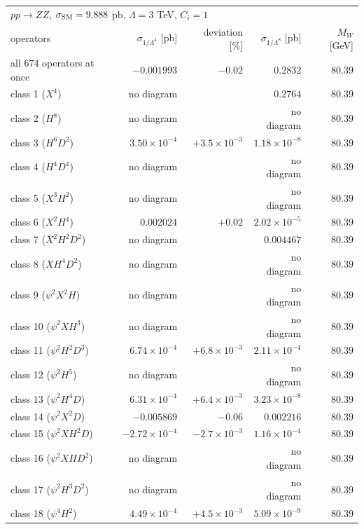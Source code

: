\begin{table}[t]\centering\footnotesize\setlength{\tabcolsep}{4pt}
\begin{tabular}{@{}lrrrr@{}}\hline
\multicolumn{5}{l}{$p p \to Z Z$, $\sigma_{\rm SM} = 9.888$ pb, $\Lambda = 3$ TeV, $C_i = 1$}\\
operators & $\sigma_{1/\Lambda^4}$ [pb] & deviation [\%] & $\sigma_{1/\Lambda^8}$ [pb] & $M_W$ [GeV]\\\hline
all 674 operators at once & $-0.001993$ & $-0.02$ & $0.2832$ & $80.39$\\
class 1 ($X^4$) & no diagram &  & $0.2764$ & $80.39$\\
class 2 ($H^8$) & no diagram &  & no diagram & $80.39$\\
class 3 ($H^6 D^2$) & $3.50\times 10^{-4}$ & $+3.5\times 10^{-3}$ & $1.18\times 10^{-8}$ & $80.39$\\
class 4 ($H^4 D^4$) & no diagram &  & no diagram & $80.39$\\
class 5 ($X^3 H^2$) & no diagram &  & no diagram & $80.39$\\
class 6 ($X^2 H^4$) & $0.002024$ & $+0.02$ & $2.02\times 10^{-5}$ & $80.39$\\
class 7 ($X^2 H^2 D^2$) & no diagram &  & $0.004467$ & $80.39$\\
class 8 ($X H^4 D^2$) & no diagram &  & no diagram & $80.39$\\
class 9 ($\psi^2 X^2 H$) & no diagram &  & no diagram & $80.39$\\
class 10 ($\psi^2 X H^3$) & no diagram &  & no diagram & $80.39$\\
class 11 ($\psi^2 H^2 D^3$) & $6.74\times 10^{-4}$ & $+6.8\times 10^{-3}$ & $2.11\times 10^{-4}$ & $80.39$\\
class 12 ($\psi^2 H^5$) & no diagram &  & no diagram & $80.39$\\
class 13 ($\psi^2 H^4 D$) & $6.31\times 10^{-4}$ & $+6.4\times 10^{-3}$ & $3.23\times 10^{-8}$ & $80.39$\\
class 14 ($\psi^2 X^2 D$) & $-0.005869$ & $-0.06$ & $0.002216$ & $80.39$\\
class 15 ($\psi^2 X H^2 D$) & $-2.72\times 10^{-4}$ & $-2.7\times 10^{-3}$ & $1.16\times 10^{-4}$ & $80.39$\\
class 16 ($\psi^2 X H D^2$) & no diagram &  & no diagram & $80.39$\\
class 17 ($\psi^2 H^3 D^2$) & no diagram &  & no diagram & $80.39$\\
class 18 ($\psi^4 H^2$) & $4.49\times 10^{-4}$ & $+4.5\times 10^{-3}$ & $5.09\times 10^{-9}$ & $80.39$\\

\end{tabular}
\end{table}
